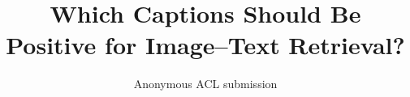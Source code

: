 \documentclass[11pt]{article}
\title{Which Captions Should Be Positive for Image--Text Retrieval?}
\author{Anonymous ACL submission}
\begin{document}



\maketitle
\begin{abstract}

\end{abstract}






\clearpage


\appendix
\raggedbottom


\clearpage

\clearpage






\end{document}
